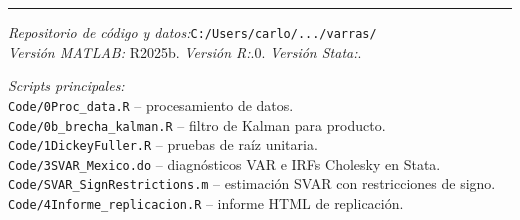 \documentclass[11pt,letterpaper]{article}
\begin{document}
\vspace{1cm}
\hrule
\vspace{0.4cm}

\noindent\textit{Repositorio de código y datos:}\;\texttt{C:/Users/carlo/.../varras/}\\
\noindent\textit{Versión MATLAB:}\; R2025b. \quad \textit{Versión R:}.0. \quad \textit{Versión Stata:}.

\noindent\textit{Scripts principales:}\\
\hspace*{1em}\texttt{Code/0Proc\_data.R} -- procesamiento de datos.\\
\hspace*{1em}\texttt{Code/0b\_brecha\_kalman.R} -- filtro de Kalman para producto.\\
\hspace*{1em}\texttt{Code/1DickeyFuller.R} -- pruebas de raíz unitaria.\\
\hspace*{1em}\texttt{Code/3SVAR\_Mexico.do} -- diagnósticos VAR e IRFs Cholesky en Stata.\\
\hspace*{1em}\texttt{Code/SVAR\_SignRestrictions.m} -- estimación SVAR con restricciones de signo.\\
\hspace*{1em}\texttt{Code/4Informe\_replicacion.R} -- informe HTML de replicación.
\end{document}
